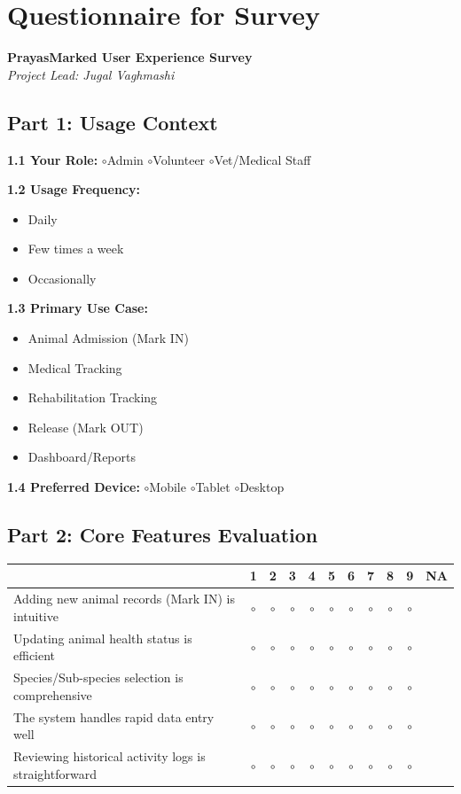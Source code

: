 \documentclass[12pt,a4paper]{report}
\newcommand{\opt}{\(\circ\)}
\newcommand{\likertheader}{ & 1 & 2 & 3 & 4 & 5 & 6 & 7 & 8 & 9 & NA \\
\hline}
\newcommand{\likertrow}[1]{#1 & \opt & \opt & \opt & \opt & \opt & \opt & \opt & \opt & \opt &  \\
\hline}
\begin{document}
\newpage
\appendix
\chapter{Questionnaire for Survey}

\begin{center}
{\LARGE \textbf{PrayasMarked User Experience Survey}}\\
{\small \textit{Project Lead: Jugal Vaghmashi}}
\end{center}

\vspace{0.4cm}

\section*{Part 1: Usage Context}
\begin{boxstyle}
\textbf{1.1 Your Role:} \opt Admin \quad \opt Volunteer \quad \opt Vet/Medical Staff

\textbf{1.2 Usage Frequency:}
\begin{itemize}[label=\opt,noitemsep]
\item Daily
\item Few times a week
\item Occasionally
\end{itemize}

\textbf{1.3 Primary Use Case:}
\begin{itemize}[label=\opt,noitemsep]
\item Animal Admission (Mark IN)
\item Medical Tracking
\item Rehabilitation Tracking
\item Release (Mark OUT)
\item Dashboard/Reports
\end{itemize}

\textbf{1.4 Preferred Device:} \opt Mobile \quad \opt Tablet \quad \opt Desktop
\end{boxstyle}

\section*{Part 2: Core Features Evaluation}
\begin{boxstyle}
\begin{tabularx}{\textwidth}{|Y|*{10}{c|}}
\hline
\likertheader
\likertrow{Adding new animal records (Mark IN) is intuitive}
\likertrow{Updating animal health status is efficient}
\likertrow{Species/Sub-species selection is comprehensive}
\likertrow{The system handles rapid data entry well}
\likertrow{Reviewing historical activity logs is straightforward}
\end{tabularx}
\end{boxstyle}
\end{document}
